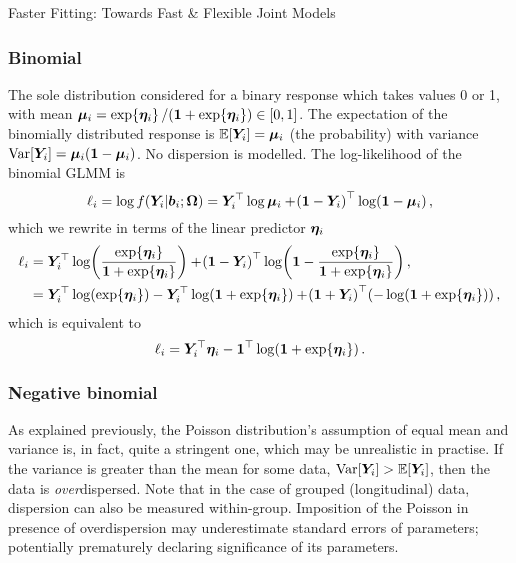 \begin{chapter}{\label{cha:flexible}Faster Fitting: Towards Fast \& Flexible Joint Models}
\subsubsection*{Binomial}
The sole distribution considered for a binary response which takes values 0 or 1, with mean $\bm{\mu}_i=\exp\!\left\{\bm{\eta}_i\right\}/\!\left(\bm{1}+\exp\!\left\{\bm{\eta}_i\right\}\right)\in[0,1]$. The expectation of the binomially distributed response is $\operatorname{\mathbb{E}}\!\left[\bm{Y}_i\right]=\bm{\mu}_i$ (\ie the probability) with variance $\mathrm{Var}\!\left[\bm{Y}_i\right]=\bm{\mu}_i\!\left(\bm{1}-\bm{\mu}_i\right)$. No dispersion is modelled. The log-likelihood of the binomial GLMM is 
\begin{equation*}
    \ell_i=\log f\!\left(\bm{Y}_i|\bm{b}_i;\bm{\mathrm{\Omega}}\right) = \bm{Y}_i^\top\log\bm{\mu}_i+\!\left(\bm{1}-\bm{Y}_i\right)^\top\log\!\left(\bm{1}-\bm{\mu}_i\right),
\end{equation*}
which we rewrite in terms of the linear predictor $\bm{\eta}_i$
\begin{align*}
    \ell_i&=\Y^\top\log\lb\frac{\exp\lbr\linp\rbr}{\bone+\exp\lbr\linp\rbr}\rb+\lb\bone-\Y\rb^\top\log\lb\bone-\frac{\exp\lbr\linp\rbr}{\bone+\exp\lbr\linp\rbr}\rb,\\
    &=\Y^\top\log\lb\exp\lbr\linp\rbr\rb-\Y^\top\log\lb\bone+\exp\lbr\linp\rbr\rb+\lb\bone+\Y\rb^\top\lb-\log\lb\bone+\exp\lbr\linp\rbr\rb\rb,
\end{align*}
which is equivalent to 
\begin{equation}
    \ell_i=\bm{Y}_i^\top\bm{\eta}_i-\bm{1}^\top\log\!\left(\bm{1}+\exp\!\left\{\bm{\eta}_i\right\}\right).
\label{eq:flexible-binomial-ll}
\end{equation}

\subsubsection*{Negative binomial}
As explained previously, the Poisson distribution's assumption of equal mean and variance is, in fact, quite a stringent one, which may be unrealistic in practise. If the variance is greater than the mean for some data, $\mathrm{Var}\!\left[\bm{Y}_i\right]>\operatorname{\mathbb{E}}\!\left[\bm{Y}_i\right]$, then the data is \textit{over}dispersed. Note that in the case of grouped (\eg longitudinal) data, dispersion can also be measured within-group. Imposition of the Poisson in presence of overdispersion may underestimate standard errors of parameters; potentially prematurely declaring significance of its parameters. 


\end{chapter}

